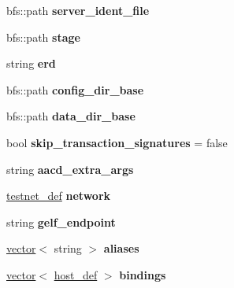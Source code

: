 \begin{DoxyCompactItemize}
bfs\+::path {\bfseries server\+\_\+ident\+\_\+file}
\item 
\mbox{\label{structlauncher__def_a7d8c2890c8a7a4229125c3ede9c954a5}} 
bfs\+::path {\bfseries stage}
\item 
\mbox{\label{structlauncher__def_afc7e6377c29229eb93443d7a49f3e436}} 
string {\bfseries erd}
\item 
\mbox{\label{structlauncher__def_a14ab93cccdc754a6467e2b5cdb7b4b2c}} 
bfs\+::path {\bfseries config\+\_\+dir\+\_\+base}
\item 
\mbox{\label{structlauncher__def_a963c76c2d307645cf98d1e796c1327ab}} 
bfs\+::path {\bfseries data\+\_\+dir\+\_\+base}
\item 
\mbox{\label{structlauncher__def_ac7a18967df8a9726bad195f628ebb34d}} 
bool {\bfseries skip\+\_\+transaction\+\_\+signatures} = false
\item 
\mbox{\label{structlauncher__def_a896a1e1ad7dbcc48cca6724556441de4}} 
string {\bfseries aacd\+\_\+extra\+\_\+args}
\item 
\mbox{\label{structlauncher__def_a18060f5d187f7ee454e5618fbc925db4}} 
\mbox{\hyperlink{structtestnet__def}{testnet\+\_\+def}} {\bfseries network}
\item 
\mbox{\label{structlauncher__def_abb71007dba0e53fb94932f65b96db4b1}} 
string {\bfseries gelf\+\_\+endpoint}
\item 
\mbox{\label{structlauncher__def_a80a2954ced2e22fab24a84482aa1872c}} 
\mbox{\hyperlink{classstd_1_1vector}{vector}}$<$ string $>$ {\bfseries aliases}
\item 
\mbox{\label{structlauncher__def_ab826b2e5d4181fcfe907c17f14443bcf}} 
\mbox{\hyperlink{classstd_1_1vector}{vector}}$<$ \mbox{\hyperlink{classhost__def}{host\+\_\+def}} $>$ {\bfseries bindings}
\item 
\mbox{\label{structlauncher__def_a3931f991aa3a62e6ceb6cc6c1e3097c7}} 

\end{DoxyCompactItemize}
